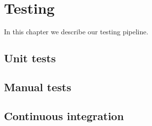 \chapter{Testing}

In this chapter we describe our testing pipeline.

\section{Unit tests}
\section{Manual tests}
\section{Continuous integration}